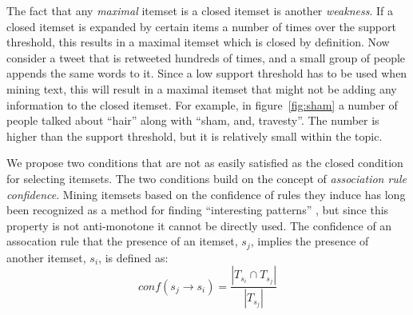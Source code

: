 \documentclass{sig-alternate}
\begin{document}
The fact that any \emph{maximal} itemset is a closed itemset
is another \emph{weakness}. %
If a closed itemset is expanded by certain items a number of times
over the support threshold, this results in a maximal itemset
which is closed by definition.
Now consider a tweet that is retweeted hundreds of times, 
and a small group of people appends the same words to it.
Since  a low support threshold has to be used when mining text,
this will result in a maximal itemset that
might not be adding any information to the closed itemset.
For example, in figure~\ref{fig:sham} a number of people
talked about ``hair'' along with ``sham, and, travesty''. 
The number is higher than the support threshold,
but it is relatively small within the topic.

We propose two conditions that are not as easily satisfied as the closed
condition for selecting itemsets.
The two conditions build on the concept of \emph{association rule confidence}.
Mining itemsets based on the confidence of rules they induce has long been
recognized as a method for finding
``interesting patterns'' \cite{cohen2001finding},
but since this property is not anti-monotone 
it cannot be directly used.
The confidence of an assocation rule that the presence of an itemset,
$s_{j}$, implies the presence of another itemset, $s_i$, is  defined as:
\begin{equation}\label{eq:conf}conf(s_j \rightarrow s_i) = \frac{|T_{s_i} \cap T_{s_j}|}{|T_{s_j}|}\end{equation}
\end{document}
